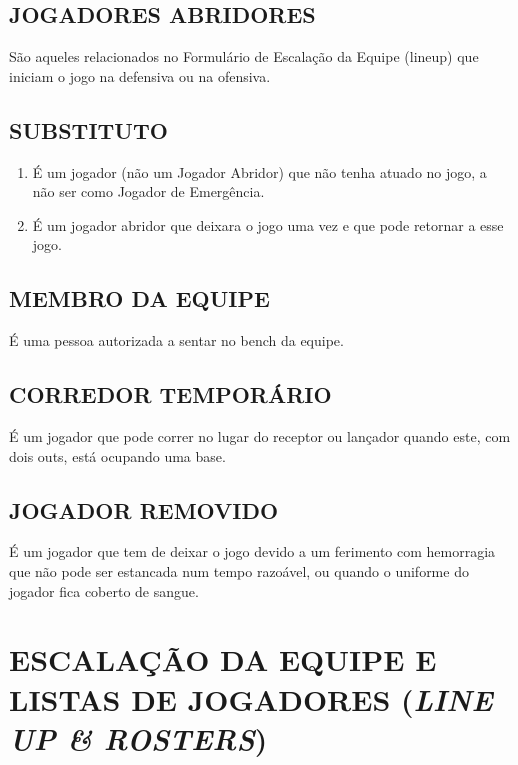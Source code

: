 \subsection{JOGADORES ABRIDORES}
 São aqueles relacionados no Formulário de Escalação da Equipe (\gls{lineup}) que iniciam o jogo na defensiva ou na ofensiva.

\subsection{SUBSTITUTO}

\begin{enumerate}[label=(\alph*)]
	\item É um jogador (não um Jogador Abridor) que não tenha atuado no jogo, a não ser como Jogador de Emergência.
	\item É um jogador abridor que deixara o jogo uma vez e que pode retornar a esse  jogo.
\end{enumerate}

\subsection{MEMBRO DA EQUIPE}
 É uma pessoa autorizada a sentar no \gls{bench} da equipe.
\subsection{CORREDOR TEMPORÁRIO}

É um jogador que pode correr no lugar do receptor ou lançador quando este, com dois \glspl{out}, está ocupando uma base.
\subsection{JOGADOR REMOVIDO}

É um jogador que tem de deixar o jogo devido a um ferimento com hemorragia que não pode ser estancada num tempo razoável, ou quando o uniforme do jogador fica coberto de sangue.

\section{ESCALAÇÃO DA EQUIPE E LISTAS DE JOGADORES (\textit{LINE UP \& ROSTERS})}
